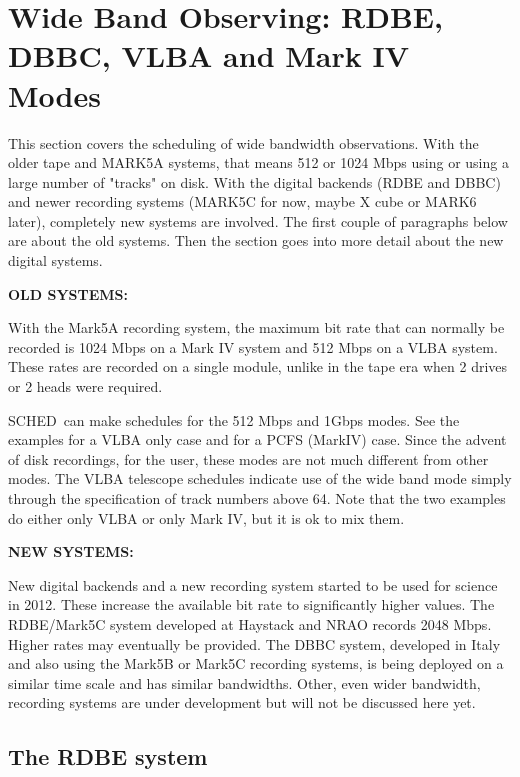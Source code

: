 \documentclass{report}
\newcommand{\schedb}{{\sc SCHED~}}
\begin{document}
\section{\label{SEC:WIDE}Wide Band Observing: RDBE, DBBC, VLBA and
Mark IV Modes}

This section covers the scheduling of wide bandwidth observations.
With the older tape and MARK5A systems, that means 512 or 1024 Mbps
using or using a large number of "tracks" on disk.  With the digital
backends (RDBE and DBBC) and newer recording systems (MARK5C for now,
maybe X cube or MARK6 later), completely new systems are involved.
The first couple of paragraphs below are about the old systems.  Then
the section goes into more detail about the new digital systems.

{\bf OLD SYSTEMS:}

With the Mark5A recording system, the maximum bit rate that can
normally be recorded is 1024 Mbps on a Mark IV system and 512 Mbps
on a VLBA system.  These rates are recorded on a single module, unlike
in the tape era when 2 drives or 2 heads were required.

\schedb can make schedules for the 512 Mbps and 1Gbps modes.  See the
examples  for a
VLBA only case and  for a PCFS (MarkIV) case.  Since the
advent of disk recordings, for the
user, these modes are not much different from other modes.  The
VLBA telescope schedules indicate use of the wide band mode simply
through the specification of track numbers above 64.  Note that the
two examples do either only VLBA or only Mark IV, but it is ok to mix
them.

{\bf NEW SYSTEMS:}

New digital backends and a new recording system started to be used for
science in 2012.  These increase the available bit rate to
significantly higher values.  The RDBE/Mark5C system developed at
Haystack and NRAO records 2048 Mbps.  Higher rates may eventually be
provided.  The DBBC system, developed in Italy and also using the
Mark5B or Mark5C recording systems, is being deployed on a similar time
scale and has similar bandwidths.  Other, even wider bandwidth,
recording systems are under development but will not be discussed here
yet.

\subsection{\label{SSEC:RDBE}The RDBE system}
\end{document}
